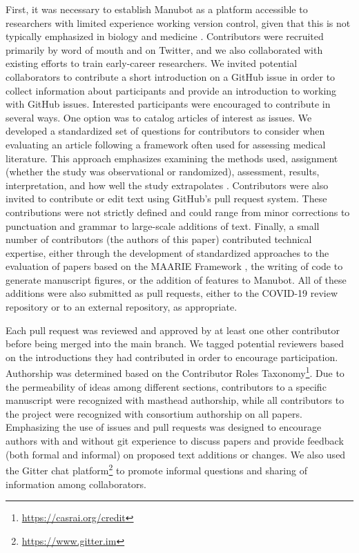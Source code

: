\documentclass[twocolumn]{ceurart}
\begin{document}
First, it was necessary to establish Manubot as a platform accessible to researchers with limited experience working version control, given that this is not typically emphasized in biology and medicine \citep{1HmO21gZN, OO1DuZd, 4ny1onB0}.
Contributors were recruited primarily by word of mouth and on Twitter, and we also collaborated with existing efforts to train early-career researchers.
We invited potential collaborators to contribute a short introduction on a GitHub issue in order to collect information about participants and provide an introduction to working with GitHub issues.
Interested participants were encouraged to contribute in several ways.
One option was to catalog articles of interest as issues.
We developed a standardized set of questions for contributors to consider when evaluating an article following a framework often used for assessing medical literature.
This approach emphasizes examining the methods used, assignment (whether the study was observational or randomized), assessment, results, interpretation, and how well the study extrapolates \citep{17OQtAY4l}.
Contributors were also invited to contribute or edit text using GitHub's pull request system.
These contributions were not strictly defined and could range from minor corrections to punctuation and grammar to large-scale additions of text.
Finally, a small number of contributors (the authors of this paper) contributed technical expertise, either through the development of standardized approaches to the evaluation of papers based on the MAARIE Framework \citep{k1GJLUxP}, the writing of code to generate manuscript figures, or the addition of features to Manubot.
All of these additions were also submitted as pull requests, either to the COVID-19 review repository or to an external repository, as appropriate.

Each pull request was reviewed and approved by at least one other contributor before being merged into the main branch.
We tagged potential reviewers based on the introductions they had contributed in order to encourage participation.
Authorship was determined based on the Contributor Roles Taxonomy\footnote{\url{https://casrai.org/credit}}.
Due to the permeability of ideas among different sections, contributors to a specific manuscript were recognized with masthead authorship, while all contributors to the project were recognized with consortium authorship on all papers.
Emphasizing the use of issues and pull requests was designed to encourage authors with and without git experience to discuss papers and provide feedback (both formal and informal) on proposed text additions or changes.
We also used the Gitter chat platform\footnote{\url{https://www.gitter.im}} to promote informal questions and sharing of information among collaborators.
\end{document}
